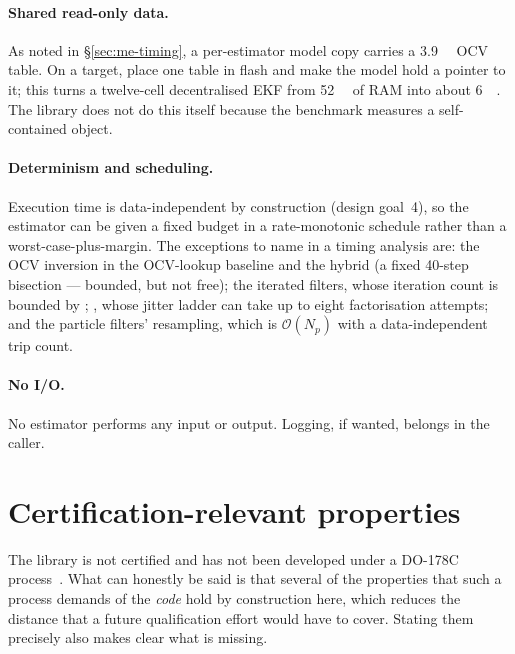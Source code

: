 \paragraph{Shared read-only data.} As noted in \S\ref{sec:me-timing}, a per-estimator model copy
carries a \SI{3.9}{\kilo\byte} OCV table. On a target, place one  table in flash and
make the model hold a pointer to it; this turns a twelve-cell decentralised EKF from
\SI{52}{\kilo\byte} of RAM into about \SI{6}{\kilo\byte}. The library does not do this itself
because the benchmark measures a self-contained object.

\paragraph{Determinism and scheduling.} Execution time is data-independent by construction
(design goal~4), so the estimator can be given a fixed budget in a rate-monotonic schedule rather
than a worst-case-plus-margin. The exceptions to name in a timing analysis are: the OCV inversion in
the OCV-lookup baseline and the hybrid (a fixed 40-step bisection --- bounded, but not free); the
iterated filters, whose iteration count is bounded by ; ,
whose jitter ladder can take up to eight factorisation attempts; and the particle filters'
resampling, which is $\mathcal{O}(N_p)$ with a data-independent trip count.

\paragraph{No I/O.} No estimator performs any input or output. Logging, if wanted, belongs in the
caller.

\section{Certification-relevant properties}

The library is not certified and has not been developed under a DO-178C
process~\cite{rtca2011do178c}. What can honestly be said is that several of the properties that
such a process demands of the \emph{code} hold by construction here, which reduces the distance
that a future qualification effort would have to cover. Stating them precisely also makes clear
what is missing.

